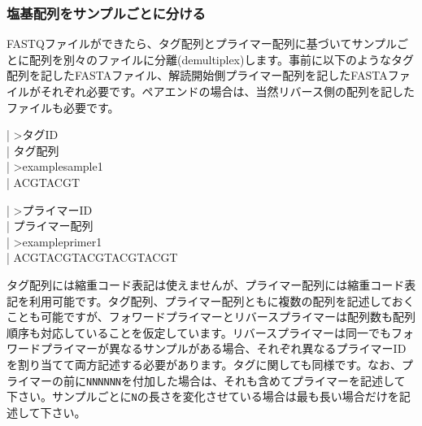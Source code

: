 \documentclass[titlepage,10pt,a4paper]{jsbook}
\newenvironment{content}{\begin{shaded}\vspace{-1em}\raggedright\ttfamily\footnotesize\setlength{\baselineskip}{1.4em}}{\end{shaded}\vspace{-1em}}
\begin{document}
\subsubsection{塩基配列をサンプルごとに分ける}

FASTQファイルができたら、タグ配列とプライマー配列に基づいてサンプルごとに配列を別々のファイルに分離(demultiplex)します。事前に以下のようなタグ配列を記したFASTAファイル、解読開始側プライマー配列を記したFASTAファイルがそれぞれ必要です。ペアエンドの場合は、当然リバース側の配列を記したファイルも必要です。
\begin{content}
| {\textgreater}タグID\\
| タグ配列\\
| {\textgreater}examplesample1\\
| ACGTACGT
\end{content}
\begin{content}
| {\textgreater}プライマーID\\
| プライマー配列\\
| {\textgreater}exampleprimer1\\
| ACGTACGTACGTACGTACGT
\end{content}
タグ配列には縮重コード表記は使えませんが、プライマー配列には縮重コード表記を利用可能です。タグ配列、プライマー配列ともに複数の配列を記述しておくことも可能ですが、フォワードプライマーとリバースプライマーは配列数も配列順序も対応していることを仮定しています。リバースプライマーは同一でもフォワードプライマーが異なるサンプルがある場合、それぞれ異なるプライマーIDを割り当てて両方記述する必要があります。タグに関しても同様です。なお、プライマーの前に\texttt{NNNNNN}を付加した場合は、それも含めてプライマーを記述して下さい。サンプルごとに\texttt{N}の長さを変化させている場合は最も長い場合だけを記述して下さい。
\end{document}
